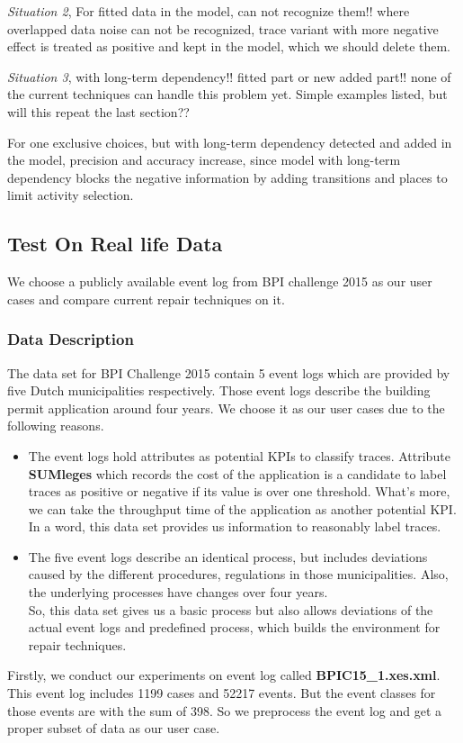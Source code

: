 \emph{Situation 2}, For fitted data in the model, can not recognize them!! where overlapped data noise can not be recognized, trace variant with more negative effect is treated as positive and kept in the model, which we should delete them.   

\emph{Situation 3}, with long-term dependency!! fitted part or new added part!! none of the current techniques can handle this problem yet.
Simple examples listed, but will this repeat the last section?? 


For one exclusive choices, 
but with long-term dependency detected and added in the model, precision and accuracy increase, since model with long-term dependency blocks the negative information by adding transitions and places to limit activity selection. 

\subsection{Test On Real life Data}
We choose a publicly available event log from BPI challenge 2015 as our user cases and compare current repair techniques on it. 
\subsubsection{Data Description}
The data set for BPI Challenge 2015 contain 5 event logs which are provided by five Dutch municipalities respectively. Those event logs describe the building permit application around four years. We choose it as our user cases due to the following reasons.
\begin{itemize}
	\item The event logs hold attributes as potential KPIs to classify traces. Attribute \textbf{SUMleges} which records the cost of the application is a candidate to label traces as positive or negative if its value  is over one threshold. What's more, we can take the throughput time of the application as another potential KPI. \\
	In a word, this data set provides us information to reasonably label traces.
	\item The five event logs describe an identical process, but includes deviations caused by the different procedures, regulations in those municipalities. Also, the underlying processes have changes over four years.\\
	So, this data set gives us a basic process but also allows deviations of the actual event logs and predefined process, which builds the environment for repair techniques.
\end{itemize}
Firstly, we conduct our experiments on event log called \textbf{BPIC15\_1.xes.xml}. This event log includes 1199 cases and 52217 events. But the event classes for those events are  with the sum of 398. So we preprocess the event log and get a proper subset of data as our user case. 

